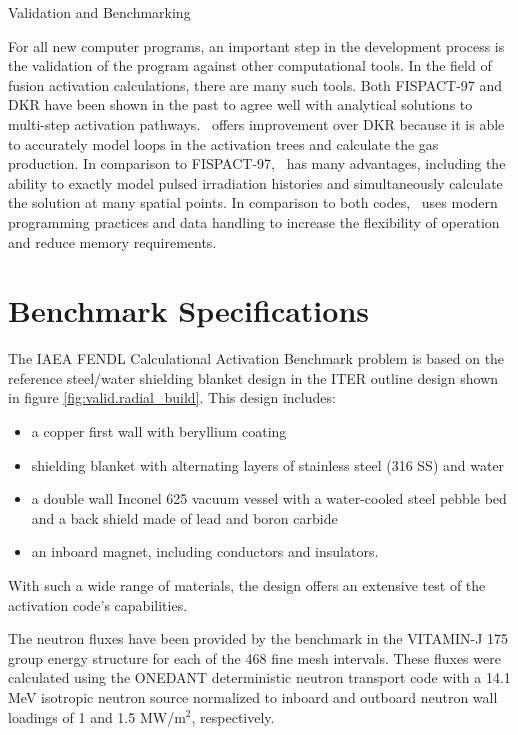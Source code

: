 \begin{chapter}{Validation and Benchmarking}

For all new computer programs, an important step in the development
process is the validation of the program against other computational
tools.  In the field of fusion activation calculations, there are many
such tools.  Both FISPACT-97 and DKR have been shown in the past to
agree well with analytical solutions to multi-step activation
pathways\cite{IAEA.bench2.rep}.  \ALARA\ offers improvement over
DKR because it is able to accurately model loops in the activation
trees and calculate the gas production.  In comparison to FISPACT-97,
\ALARA\ has many advantages, including the ability to exactly model
pulsed irradiation histories and simultaneously calculate the solution
at many spatial points.  In comparison to both codes, \ALARA\ uses
modern programming practices and data handling to increase the
flexibility of operation and reduce memory requirements.

\section{Benchmark Specifications}

The IAEA FENDL Calculational Activation
Benchmark\cite{IAEA.bench1.spec} problem is based on the reference
steel/water shielding blanket design in the ITER outline design shown
in figure \ref{fig:valid.radial_build}.  This design includes:
\begin{itemize}
\item a copper first wall with beryllium coating
\item shielding blanket with alternating layers of stainless steel
  (316 SS) and water
\item a double wall Inconel 625 vacuum vessel with a water-cooled
  steel pebble bed and a back shield made of lead and boron carbide
\item an inboard magnet, including conductors and insulators.
\end{itemize}
With such a wide range of materials, the design offers an extensive
test of the activation code's capabilities.

The neutron fluxes have been provided by the benchmark in the
VITAMIN-J 175 group energy structure for each of the 468 fine mesh
intervals.  These fluxes were calculated using the
ONEDANT\cite{ONEDANT} deterministic neutron transport code with a
14.1 MeV isotropic neutron source normalized to inboard and outboard
neutron wall loadings of 1 and 1.5 MW/m$^2$, respectively.


\end{chapter}
